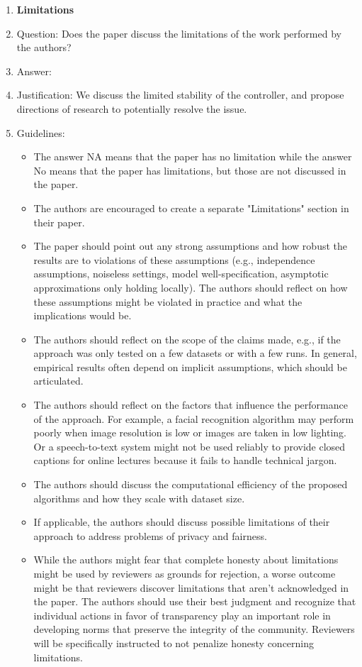 \documentclass{article}
\begin{document}
\begin{enumerate}
\item {\bf Limitations}
    \item[] Question: Does the paper discuss the limitations of the work performed by the authors?
    \item[] Answer: \answerYes{} %
    \item[] Justification: We discuss the limited stability of the controller, and propose directions of research to potentially resolve the issue.
    \item[] Guidelines:
    \begin{itemize}
        \item The answer NA means that the paper has no limitation while the answer No means that the paper has limitations, but those are not discussed in the paper. 
        \item The authors are encouraged to create a separate "Limitations" section in their paper.
        \item The paper should point out any strong assumptions and how robust the results are to violations of these assumptions (e.g., independence assumptions, noiseless settings, model well-specification, asymptotic approximations only holding locally). The authors should reflect on how these assumptions might be violated in practice and what the implications would be.
        \item The authors should reflect on the scope of the claims made, e.g., if the approach was only tested on a few datasets or with a few runs. In general, empirical results often depend on implicit assumptions, which should be articulated.
        \item The authors should reflect on the factors that influence the performance of the approach. For example, a facial recognition algorithm may perform poorly when image resolution is low or images are taken in low lighting. Or a speech-to-text system might not be used reliably to provide closed captions for online lectures because it fails to handle technical jargon.
        \item The authors should discuss the computational efficiency of the proposed algorithms and how they scale with dataset size.
        \item If applicable, the authors should discuss possible limitations of their approach to address problems of privacy and fairness.
        \item While the authors might fear that complete honesty about limitations might be used by reviewers as grounds for rejection, a worse outcome might be that reviewers discover limitations that aren't acknowledged in the paper. The authors should use their best judgment and recognize that individual actions in favor of transparency play an important role in developing norms that preserve the integrity of the community. Reviewers will be specifically instructed to not penalize honesty concerning limitations.
    \end{itemize}


\end{enumerate}
\end{document}
